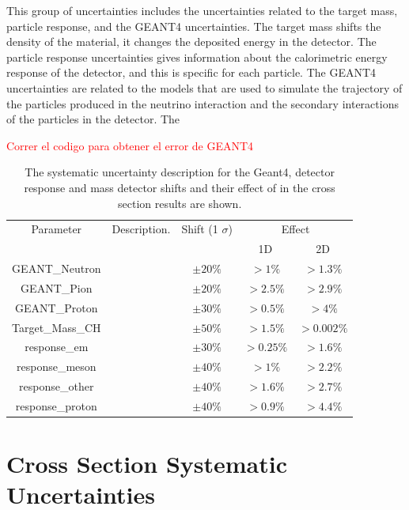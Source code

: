 This group of uncertainties includes the uncertainties related to the target mass, particle response, and the GEANT4 uncertainties. The target mass shifts the density of the material, it changes the deposited energy in the detector. The particle response uncertainties gives information about the calorimetric energy response of the detector, and this is specific for each particle. The GEANT4 uncertainties are related to the models that are used to simulate the trajectory of the particles produced in the neutrino interaction and the secondary interactions of the particles in the detector. The

\textcolor{red}{Correr el codigo para obtener el error de GEANT4}



\begin{table}[!htb]
    \centering
    \begin{tabular}{c|p{2in}|c|c|c}
        \hline 
        Parameter & Description.  & Shift (1 $\sigma$) & \multicolumn{2}{c}{Effect} \\
         & & & 1D & 2D \\
        \hline  
        GEANT\_Neutron & & $\pm20\%$ & $>1\%$ & $>1.3\%$\\ \hline
        GEANT\_Pion &  & $\pm20\%$ & $>2.5\%$ & $>2.9\%$ \\ \hline
        GEANT\_Proton &  & $\pm30\%$ & $>0.5\%$ & $>4\%$ \\ \hline
        Target\_Mass\_CH &  & $\pm50\%$ & $>1.5\%$ & $>0.002\%$\\ \hline
        response\_em &  & $\pm30\%$ & $>0.25\%$ & $>1.6\%$ \\ \hline
        response\_meson &  & $\pm40\%$ & $>1\%$ & $>2.2\%$\\ \hline
        response\_other &  & $\pm40\%$ & $>1.6\%$ & $>2.7\%$\\ \hline
        response\_proton &  & $\pm40\%$ & $>0.9\%$ & $>4.4\%$\\ \hline
    \end{tabular}
    \caption{The systematic uncertainty description for the Geant4, detector response and mass detector shifts and their effect of in the cross section results are shown. }
    \label{tab:ErrorAnalysis:SystematicUnc:Other}
\end{table}


\pagebreak

\section{Cross Section Systematic Uncertainties}
\label{Cap:ErrorAnalysis:CrossSectionUncertainties}

